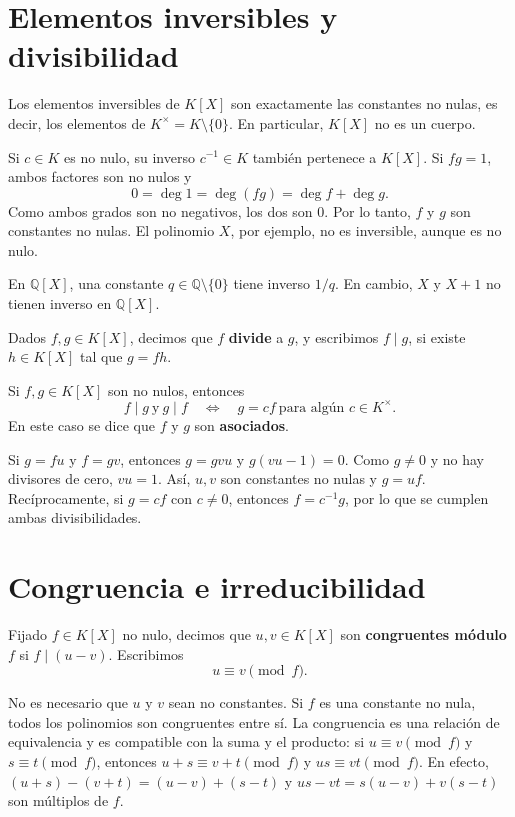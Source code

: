 \section{Elementos inversibles y divisibilidad}
\begin{proposicion}
Los elementos inversibles de $K[X]$ son exactamente las constantes
no nulas, es decir, los elementos de $K^\times=K\setminus\{0\}$.
En particular, $K[X]$ no es un cuerpo.
\end{proposicion}
\begin{demostracion}
Si $c\in K$ es no nulo, su inverso $c^{-1}\in K$ también pertenece a
$K[X]$. Si $fg=1$, ambos factores son no nulos y
\[
0=\deg1=\deg(fg)=\deg f+\deg g.
\]
Como ambos grados son no negativos, los dos son $0$. Por lo tanto,
$f$ y $g$ son constantes no nulas. El polinomio $X$, por ejemplo,
no es inversible, aunque es no nulo.
\end{demostracion}
\begin{ejemplo}
En $\mathbb Q[X]$, una constante $q\in\mathbb Q\setminus\{0\}$ tiene
inverso $1/q$. En cambio, $X$ y $X+1$ no tienen inverso en $\mathbb Q[X]$.
\end{ejemplo}

\begin{definicion}[{title={Divisibilidad de polinomios}}]
Dados $f,g\in K[X]$, decimos que $f$ \textbf{divide} a $g$, y escribimos
$f\mid g$, si existe $h\in K[X]$ tal que $g=fh$.
\end{definicion}
\begin{proposicion}
Si $f,g\in K[X]$ son no nulos, entonces
\[
f\mid g\ \text{y}\ g\mid f
\quad\Longleftrightarrow\quad
 g=cf\ \text{para algún }c\in K^\times.
\]
En este caso se dice que $f$ y $g$ son \textbf{asociados}.
\end{proposicion}
\begin{demostracion}
Si $g=fu$ y $f=gv$, entonces $g=gvu$ y $g(vu-1)=0$.
Como $g\neq0$ y no hay divisores de cero, $vu=1$.
Así, $u,v$ son constantes no nulas y $g=uf$.
Recíprocamente, si $g=cf$ con $c\neq0$, entonces $f=c^{-1}g$,
por lo que se cumplen ambas divisibilidades.
\end{demostracion}

\section{Congruencia e irreducibilidad}
\begin{definicion}[{title={Congruencia módulo un polinomio}}]
Fijado $f\in K[X]$ no nulo, decimos que $u,v\in K[X]$ son
\textbf{congruentes módulo $f$} si $f\mid(u-v)$. Escribimos
\[
u\equiv v\pmod f.
\]
\end{definicion}
No es necesario que $u$ y $v$ sean no constantes. Si $f$ es una
constante no nula, todos los polinomios son congruentes entre sí.
La congruencia es una relación de equivalencia y es compatible con
la suma y el producto: si $u\equiv v\pmod f$ y $s\equiv t\pmod f$,
entonces $u+s\equiv v+t\pmod f$ y $us\equiv vt\pmod f$.
En efecto, $(u+s)-(v+t)=(u-v)+(s-t)$ y
$us-vt=s(u-v)+v(s-t)$ son múltiplos de $f$.

